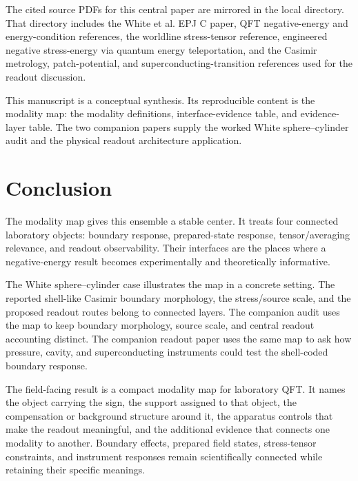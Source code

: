 \documentclass[11pt]{article}
\begin{document}
The cited source PDFs for this central paper are mirrored in the local
 directory. That directory includes
the White et al. EPJ C paper, QFT negative-energy and energy-condition
references, the worldline stress-tensor reference, engineered negative
stress-energy via quantum energy teleportation, and the Casimir metrology,
patch-potential, and superconducting-transition references used for the
readout discussion.

This manuscript is a conceptual synthesis. Its reproducible content is the
modality map: the modality definitions, interface-evidence table, and
evidence-layer table. The two companion papers supply the worked White
sphere--cylinder audit and the physical readout architecture application.

\section{Conclusion}

The modality map gives this ensemble a stable center. It treats four
connected laboratory objects: boundary response, prepared-state response,
tensor/averaging relevance, and readout observability. Their interfaces are
the places where a negative-energy result becomes experimentally and
theoretically informative.

The White sphere--cylinder case illustrates the map in a concrete setting. The
reported shell-like Casimir boundary morphology, the stress/source scale, and
the proposed readout routes belong to connected layers. The companion audit
uses the map to keep boundary morphology, source scale, and central readout
accounting distinct. The companion readout paper uses the same map to ask how
pressure, cavity, and superconducting instruments could test the shell-coded
boundary response.

The field-facing result is a compact modality map for laboratory QFT. It names
the object carrying the sign, the support assigned to that object, the
compensation or background structure around it, the apparatus controls that
make the readout meaningful, and the additional evidence that connects one
modality to another. Boundary effects, prepared field states, stress-tensor
constraints, and instrument responses remain scientifically connected while
retaining their specific meanings.
\end{document}
